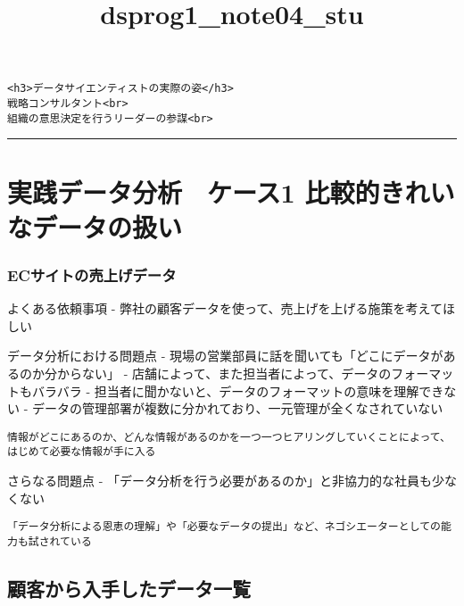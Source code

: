 \documentclass[11pt]{article}
\title{dsprog1\_note04\_stu}
\begin{document}
    
    
    \maketitle
    
    

    
    

    \begin{verbatim}
<h3>データサイエンティストの実際の姿</h3>
戦略コンサルタント<br>
組織の意思決定を行うリーダーの参謀<br>
\end{verbatim}

    \begin{center}\rule{0.5\linewidth}{\linethickness}\end{center}

    \section{実践データ分析　ケース1
比較的きれいなデータの扱い}\label{ux5b9fux8df5ux30c7ux30fcux30bfux5206ux6790ux30b1ux30fcux30b91-ux6bd4ux8f03ux7684ux304dux308cux3044ux306aux30c7ux30fcux30bfux306eux6271ux3044}

\subsubsection{ECサイトの売上げデータ}\label{ecux30b5ux30a4ux30c8ux306eux58f2ux4e0aux3052ux30c7ux30fcux30bf}

よくある依頼事項 -
弊社の顧客データを使って、売上げを上げる施策を考えてほしい

データ分析における問題点 -
現場の営業部員に話を聞いても「どこにデータがあるのか分からない」 -
店舗によって、また担当者によって、データのフォーマットもバラバラ -
担当者に聞かないと、データのフォーマットの意味を理解できない -
データの管理部署が複数に分かれており、一元管理が全くなされていない

\texttt{情報がどこにあるのか、どんな情報があるのかを一つ一つヒアリングしていくことによって、はじめて必要な情報が手に入る}

さらなる問題点 -
「データ分析を行う必要があるのか」と非協力的な社員も少なくない

\texttt{「データ分析による恩恵の理解」や「必要なデータの提出」など、ネゴシエーターとしての能力も試されている}

    \subsection{顧客から入手したデータ一覧}\label{ux9867ux5ba2ux304bux3089ux5165ux624bux3057ux305fux30c7ux30fcux30bfux4e00ux89a7}
\end{document}
